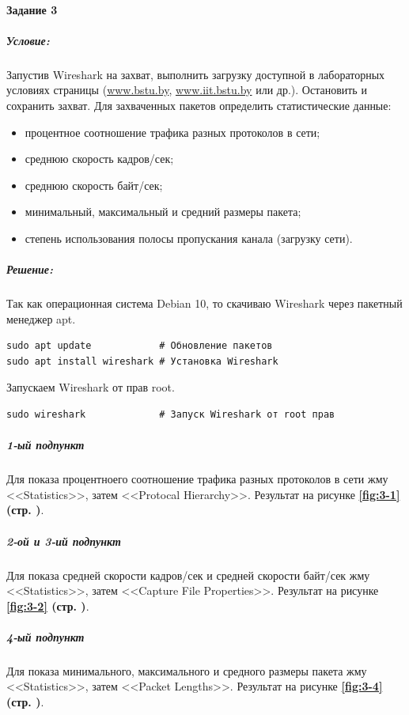 \paragraph{Задание 3}
\subparagraph{Условие:}
Запустив Wireshark на захват, выполнить загрузку доступной в лабораторных условиях страницы (\url{www.bstu.by}, \url{www.iit.bstu.by} или др.). Остановить и сохранить захват. Для захваченных пакетов определить статистические данные:

\begin{itemize}
    \item процентное соотношение трафика разных протоколов в сети;
    \item среднюю скорость кадров/сек;
    \item среднюю скорость байт/сек;
    \item минимальный, максимальный и средний размеры пакета;
    \item степень использования полосы пропускания канала (загрузку сети).
\end{itemize}

\subparagraph{Решение:} \hspace{0pt}

Так как операционная система Debian 10, то скачиваю Wireshark через пакетный менеджер apt.

\begin{lstlisting}[language=Terminal,]
sudo apt update            # Обновление пакетов
sudo apt install wireshark # Установка Wireshark
\end{lstlisting}

Запускаем Wireshark от прав root.

\begin{lstlisting}[language=Terminal,]
sudo wireshark             # Запуск Wireshark от root прав
\end{lstlisting}

\subparagraph{1-ый подпункт}
Для показа процентноего соотношение трафика разных протоколов в сети
жму <<Statistics>>, затем <<Protocal Hierarchy>>.
Результат на рисунке \textbf{\ref{fig:3-1} (стр. \pageref{fig:3-1})}.

\subparagraph{2-ой и 3-ий подпункт}
Для показа средней скорости кадров/сек и средней скорости байт/сек
жму <<Statistics>>, затем <<Capture File Properties>>.
Результат на рисунке \textbf{\ref{fig:3-2} (стр. \pageref{fig:3-2})}.

\subparagraph{4-ый подпункт}
Для показа минимального, максимального и средного размеры пакета
жму <<Statistics>>, затем <<Packet Lengths>>.
Результат на рисунке \textbf{\ref{fig:3-4} (стр. \pageref{fig:3-4})}.

